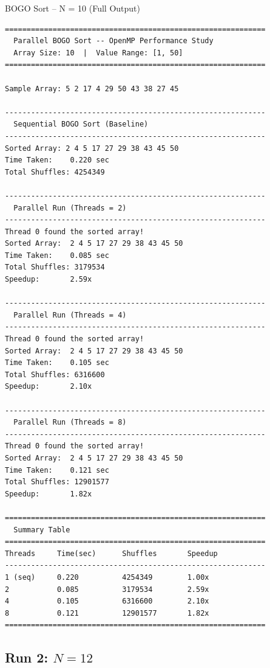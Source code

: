 \documentclass[11pt]{article}
\begin{document}
\begin{terminalbox}{BOGO Sort -- N = 10 (Full Output)}
\begin{lstlisting}[style=terminalstyle]
============================================================
  Parallel BOGO Sort -- OpenMP Performance Study
  Array Size: 10  |  Value Range: [1, 50]
============================================================

Sample Array: 5 2 17 4 29 50 43 38 27 45

------------------------------------------------------------
  Sequential BOGO Sort (Baseline)
------------------------------------------------------------
Sorted Array: 2 4 5 17 27 29 38 43 45 50
Time Taken:    0.220 sec
Total Shuffles: 4254349

------------------------------------------------------------
  Parallel Run (Threads = 2)
------------------------------------------------------------
Thread 0 found the sorted array!
Sorted Array:  2 4 5 17 27 29 38 43 45 50
Time Taken:    0.085 sec
Total Shuffles: 3179534
Speedup:       2.59x

------------------------------------------------------------
  Parallel Run (Threads = 4)
------------------------------------------------------------
Thread 0 found the sorted array!
Sorted Array:  2 4 5 17 27 29 38 43 45 50
Time Taken:    0.105 sec
Total Shuffles: 6316600
Speedup:       2.10x

------------------------------------------------------------
  Parallel Run (Threads = 8)
------------------------------------------------------------
Thread 0 found the sorted array!
Sorted Array:  2 4 5 17 27 29 38 43 45 50
Time Taken:    0.121 sec
Total Shuffles: 12901577
Speedup:       1.82x

============================================================
  Summary Table
============================================================
Threads     Time(sec)      Shuffles       Speedup
------------------------------------------------------------
1 (seq)     0.220          4254349        1.00x
2           0.085          3179534        2.59x
4           0.105          6316600        2.10x
8           0.121          12901577       1.82x
============================================================
\end{lstlisting}
\end{terminalbox}

\newpage

\subsection{Run 2: $N = 12$}
\end{document}
